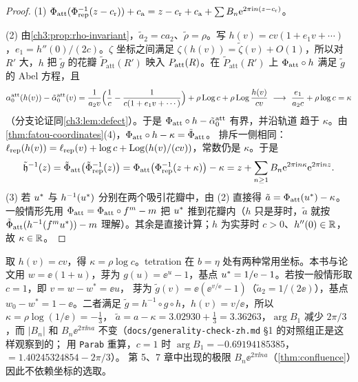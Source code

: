 \begin{proof}
(1) $\Phi_{\mathrm{att}}(\Phi_{\mathrm{rep}}^{-1}(z-c_{\mathrm r}))+c_{\mathrm a}=z-c_{\mathrm r}+c_{\mathrm a}+\sum B_n\mathrm{e}^{2\pi\mathrm{i} n(z-c_{\mathrm r})}$。

(2) 由\cref{ch3:prop:rho-invariant}，$\tilde a_2=ca_2$、$\tilde\rho=\rho$。写
$h(v)=cv(1+e_1v+\cdots)$，$e_1=h''(0)/(2c)$。$\zeta$ 坐标之间满足
$\zeta(h(v))=\tilde\zeta(v)+O(1)$，所以对 $R'$ 大，$h$ 把 $\tilde g$ 的花瓣 $\tilde P_{\mathrm{att}}(R')$
映入 $P_{\mathrm{att}}(R)$。在 $\tilde P_{\mathrm{att}}(R')$ 上 $\Phi_{\mathrm{att}}\circ h$ 满足 $\tilde g$ 的 Abel 方程，且
\[
 \alpha_0^{\mathrm{att}}(h(v))-\tilde\alpha_0^{\mathrm{att}}(v)
 =\frac{1}{a_2v}\Bigl(\frac1{c}-\frac{1}{c(1+e_1v+\cdots)}\Bigr)
 +\rho\Log c+\rho\Log\frac{h(v)}{cv}\ \longrightarrow\ \frac{e_1}{a_2c}+\rho\log c=\kappa
\]
（分支论证同\cref{ch3:lem:defect}）。于是 $\Phi_{\mathrm{att}}\circ h-\tilde\alpha_0^{\mathrm{att}}$ 有界，并沿轨道
趋于 $\kappa$。由\cref{thm:fatou-coordinates}(4)，$\Phi_{\mathrm{att}}\circ h-\kappa=\tilde\Phi_{\mathrm{att}}$。
排斥一侧相同：$\ell_{\mathrm{rep}}(h(v))=\ell_{\mathrm{rep}}(v)+\log c+\operatorname{Log}(h(v)/(cv))$，常数仍是 $\kappa$。于是
\[
 \tilde{\mathfrak h}^{-1}(z)=\tilde\Phi_{\mathrm{att}}\bigl(\tilde\Phi_{\mathrm{rep}}^{-1}(z)\bigr)
 =\Phi_{\mathrm{att}}\bigl(\Phi_{\mathrm{rep}}^{-1}(z+\kappa)\bigr)-\kappa
 =z+\sum_{n\ge1}B_n\mathrm{e}^{2\pi\mathrm{i} n\kappa}\mathrm{e}^{2\pi\mathrm{i} nz}.
\]
(3) 若 $u^{*}$ 与 $h^{-1}(u^{*})$ 分别在两个吸引花瓣中，由 (2) 直接得 $\tilde a=\Phi_{\mathrm{att}}(u^{*})-\kappa$。
一般情形先用 $\Phi_{\mathrm{att}}=\Phi_{\mathrm{att}}\circ f^m-m$ 把 $u^{*}$ 推到花瓣内（$h$ 只是芽时，$\tilde a$ 就按
$\tilde\Phi_{\mathrm{att}}(h^{-1}(f^mu^{*}))-m$ 理解）。其余是直接计算；$h$ 为实芽时 $c>0$、$h''(0)\in\mathbb{R}$，故 $\kappa\in\mathbb{R}$。
\end{proof}

\begin{remark}\label{ch3:rem:scaling}
取 $h(v)=cv$，得 $\kappa=\rho\log c$。tetration 在 $b=\eta$ 处有两种常用坐标。本书与论文用
$w=\ee(1+u)$，芽为 $g(u)=\ee^u-1$，基点 $u^{*}=1/\mathrm{e}-1$。若按一般情形取 $c=1$，即 $v=w-w^*=\ee u$，
芽为 $\tilde g(v)=\ee(\ee^{v/\ee}-1)$（$\tilde a_2=1/(2\ee)$），基点 $w_0-w^*=1-\ee$。二者满足
$\tilde g=h^{-1}\circ g\circ h$，$h(v)=v/\ee$，所以 $\kappa=\rho\log(1/\ee)=-\tfrac13$，
$\tilde a=a-\kappa=3.02930+\tfrac13=3.36263$，$\arg B_1$ 减少 $2\pi/3$，而 $|B_n|$ 和
$B_n\ee^{2\pi\ii na}$ 不变（\texttt{docs/generality-check-zh.md} §1 的对照组正是这样观察到的；
用 \texttt{Parab} 重算，$c=1$ 时 $\arg B_1=-0.69194185385$，$=1.40245324854-2\pi/3$）。
第 5、7 章中出现的极限 $B_n\ee^{2\pi\ii na}$（\cref{thm:confluence}）因此不依赖坐标的选取。
\end{remark}

